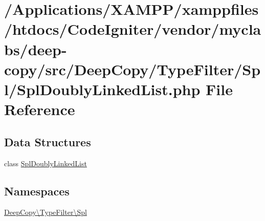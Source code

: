 \hypertarget{_spl_doubly_linked_list_8php}{}\section{/\+Applications/\+X\+A\+M\+P\+P/xamppfiles/htdocs/\+Code\+Igniter/vendor/myclabs/deep-\/copy/src/\+Deep\+Copy/\+Type\+Filter/\+Spl/\+Spl\+Doubly\+Linked\+List.php File Reference}
\label{_spl_doubly_linked_list_8php}
\subsection*{Data Structures}
\begin{DoxyCompactItemize}
\item 
class \mbox{\hyperlink{class_deep_copy_1_1_type_filter_1_1_spl_1_1_spl_doubly_linked_list}{Spl\+Doubly\+Linked\+List}}
\end{DoxyCompactItemize}
\subsection*{Namespaces}
\begin{DoxyCompactItemize}
\item 
 \mbox{\hyperlink{namespace_deep_copy_1_1_type_filter_1_1_spl}{Deep\+Copy\textbackslash{}\+Type\+Filter\textbackslash{}\+Spl}}
\end{DoxyCompactItemize}
